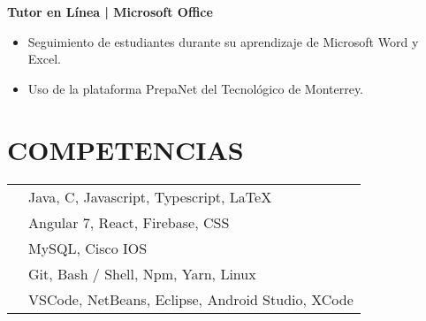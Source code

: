 \documentclass{res}
\begin{document}
\begin{resume}
    \textbf{Tutor en Línea | Microsoft Office} 
    \begin{itemize}
        \item Seguimiento de estudiantes durante su aprendizaje de Microsoft Word y Excel.
        \item Uso de la plataforma PrepaNet del Tecnológico de Monterrey.
    \end{itemize}

    \longjump

    \section{\large{COMPETENCIAS}} 
    \begin{tabularx}{15cm}{SB}
         &
        Java, C, Javascript, Typescript, LaTeX
        \\
         &
        Angular 7, React, Firebase, CSS
        \\
         &
        MySQL, Cisco IOS
        \\
         &
        Git, Bash / Shell, Npm, Yarn, Linux
        \\
         &
        VSCode, NetBeans, Eclipse, Android Studio, XCode
    \end{tabularx}
\end{resume}
\end{document}
